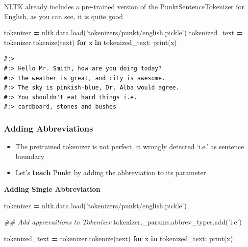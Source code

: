 \documentclass[
]{book}
\newenvironment{Shaded}{\begin{snugshade}}{\end{snugshade}}
\newcommand{\BuiltInTok}[1]{#1}
\newcommand{\CommentTok}[1]{\textcolor[rgb]{0.37,0.37,0.37}{\textit{#1}}}
\newcommand{\ControlFlowTok}[1]{\textcolor[rgb]{0.27,0.27,0.27}{\textbf{#1}}}
\newcommand{\KeywordTok}[1]{\textcolor[rgb]{0.27,0.27,0.27}{\textbf{#1}}}
\newcommand{\NormalTok}[1]{#1}
\newcommand{\OperatorTok}[1]{\textcolor[rgb]{0.43,0.43,0.43}{\textbf{#1}}}
\newcommand{\StringTok}[1]{\textcolor[rgb]{0.5,0.5,0.5}{#1}}
\providecommand{\tightlist}{%
  \setlength{\itemsep}{0pt}\setlength{\parskip}{0pt}}
\begin{document}
NLTK already includes a pre-trained version of the PunktSentenceTokenizer for English, as you can see, it is quite good

\begin{Shaded}
\begin{Highlighting}[]
\NormalTok{tokenizer      }\OperatorTok{=}\NormalTok{ nltk.data.load(}\StringTok{'tokenizers/punkt/english.pickle'}\NormalTok{)}
\NormalTok{tokenized_text }\OperatorTok{=}\NormalTok{ tokenizer.tokenize(text) }
\ControlFlowTok{for}\NormalTok{ x }\KeywordTok{in}\NormalTok{ tokenized_text:}
  \BuiltInTok{print}\NormalTok{(x) }
\end{Highlighting}
\end{Shaded}

\begin{verbatim}
#:> 
#:> Hello Mr. Smith, how are you doing today?
#:> The weather is great, and city is awesome.
#:> The sky is pinkish-blue, Dr. Alba would agree.
#:> You shouldn't eat hard things i.e.
#:> cardboard, stones and bushes
\end{verbatim}

\hypertarget{adding-abbreviations}{%
\subsubsection{Adding Abbreviations}\label{adding-abbreviations}}

\begin{itemize}
\tightlist
\item
  The pretrained tokenizer is not perfect, it wrongly detected `i.e.' as sentence boundary\\
\item
  Let's \textbf{teach} Punkt by adding the abbreviation to its parameter
\end{itemize}

\textbf{Adding Single Abbreviation}

\begin{Shaded}
\begin{Highlighting}[]

\NormalTok{tokenizer      }\OperatorTok{=}\NormalTok{ nltk.data.load(}\StringTok{'tokenizers/punkt/english.pickle'}\NormalTok{)}

\CommentTok{## Add apprevaitions to Tokenizer}
\NormalTok{tokenizer._params.abbrev_types.add(}\StringTok{'i.e'}\NormalTok{)}

\NormalTok{tokenized_text }\OperatorTok{=}\NormalTok{ tokenizer.tokenize(text) }
\ControlFlowTok{for}\NormalTok{ x }\KeywordTok{in}\NormalTok{ tokenized_text:}
  \BuiltInTok{print}\NormalTok{(x)}
\end{Highlighting}
\end{Shaded}
\end{document}
